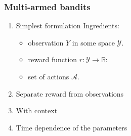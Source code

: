 \documentclass[11pt]{article}
\newcommand{\RR}{\mathbb{R}}
\begin{document}
\subsubsection{Multi-armed bandits}
\label{sec-1-2-3}
\begin{enumerate}
\item Simplest formulation
\label{sec-1-2-3-1}
Ingredients:

\begin{itemize}
\item observation $Y$ in some space $\mathcal{Y}$.
\item reward function $r: \mathcal{Y} \rightarrow \RR$:
\item set of actions $\mathcal{A}$.
\end{itemize}
\item Separate reward from observations
\label{sec-1-2-3-2}
\item With context
\label{sec-1-2-3-3}
\item Time dependence of the parameters
\label{sec-1-2-3-4}
\end{enumerate}
\end{document}
